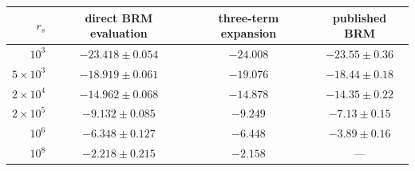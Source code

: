 \begin{tabular}{rccc}
\toprule
$r_s$ & direct BRM evaluation & three-term expansion & published BRM\\
\midrule
$10^{3}$ & $-23.418\pm0.054$ & $-24.008$ & $-23.55\pm0.36$\\
$5\times10^{3}$ & $-18.919\pm0.061$ & $-19.076$ & $-18.44\pm0.18$\\
$2\times10^{4}$ & $-14.962\pm0.068$ & $-14.878$ & $-14.35\pm0.22$\\
$2\times10^{5}$ & $-9.132\pm0.085$ & $-9.249$ & $-7.13\pm0.15$\\
$10^{6}$ & $-6.348\pm0.127$ & $-6.448$ & $-3.89\pm0.16$\\
$10^{8}$ & $-2.218\pm0.215$ & $-2.158$ & ---\\
\bottomrule
\end{tabular}

